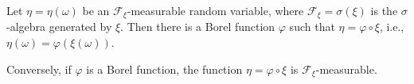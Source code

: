 Let $\eta = \eta(\omega)$ be an $\mathcal{F}_\xi$-measurable random variable, where $\mathcal{F}_\xi = \sigma(\xi)$ is the $\sigma$-algebra generated by $\xi$. Then there is a Borel function $\varphi$ such that $\eta = \varphi \circ \xi$, i.e., $\eta(\omega) = \varphi(\xi(\omega))$.

Conversely, if $\varphi$ is a Borel function, the function $\eta = \varphi \circ \xi$ is $\mathcal{F}_\xi$-measurable.

